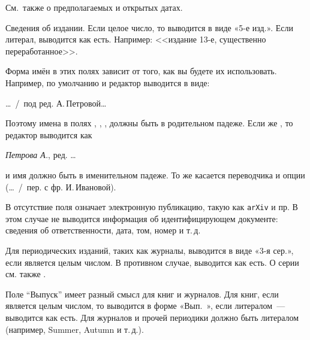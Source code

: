 \documentclass[10pt,a4paper,headings=small,numbers=enddot,english,russian]{ltxdockit}
\newenvironment{bibexample}{\begin{list}
     {}
     {\setlength{\leftmargin}{\parindent}%
      \setlength{\itemindent}{-\leftmargin}%
      \setlength{\parsep}{0pt}}}
  {\end{list}}
\begin{document}
\begin{fieldlist}
См.~также  о предполагаемых и открытых датах.


Сведения об издании. Если целое число, то выводится в виде «5-е изд.». Если литерал, выводится как есть. Например: <<издание 13-е, существенно переработанное>>.


Форма имён в этих полях зависит от того, как вы будете их использовать.
Например, по умолчанию   и редактор выводится в виде:

\begin{bibexample}
\item \ldots\ \slash\ под ред. А.\,Петровой\ldots
\end{bibexample}

Поэтому имена в полях , , ,
 должны быть в родительном падеже. Если же ,
то редактор выводится как

\begin{bibexample}
\item \textit{Петрова А.}, ред. \ldots
\end{bibexample}

и имя должно быть в именительном падеже. То же касается переводчика и опции 
(\ldots~/~пер. с фр.  И.\,Ивановой).


В  отсутствие поля  означает
электронную публикацию, такую как \texttt{arXiv} и пр.  
В этом случае не выводится информация об идентифицирующем документе:
сведения об ответственности, дата, том, номер и т.\,д.


Для периодических изданий, таких как журналы, выводится в виде «3-я сер.», если
является целым числом. В противном случае, выводится как есть.
О серии см. также .


Поле \enquote{Выпуск} имеет разный смысл для книг и журналов. Для книг, если является
целым числом, то выводится в форме «Вып.~», если литералом~--- выводится как есть.
Для журналов и прочей периодики должно быть литералом (например, Summer, Autumn и т.\,д.).


\end{fieldlist}
\end{document}
